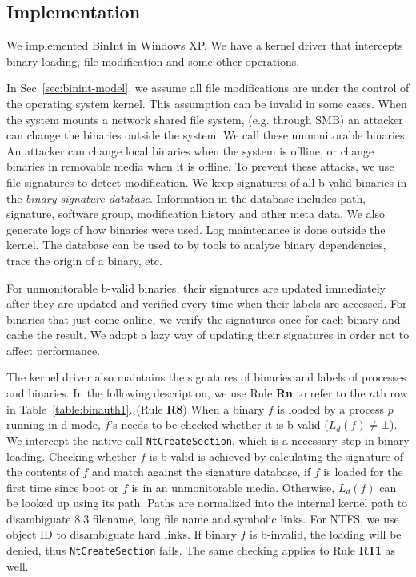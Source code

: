 \subsection{Implementation}
\label{sec:binint-imp}

We implemented BinInt in Windows XP.
We have a kernel driver that intercepts binary loading,
file modification and some other operations.

In Sec~\ref{sec:binint-model}, we assume all file modifications are under
the control of the operating system kernel.
This assumption can be invalid in some cases.
When the system mounts a network shared file system, (e.g. through SMB)
an attacker can change the binaries outside the system.
We call these unmonitorable binaries.
An attacker can change local binaries when the system is offline,
or change binaries in removable media when it is offline.
To prevent these attacks, we use file signatures to detect modification.
We keep signatures of all b-valid binaries in the
{\em binary signature database}.
Information in the database includes path, signature, software group,
modification history and other meta data.
We also generate logs of how binaries were used. Log maintenance is done
outside the kernel.
The database can be used to by tools to analyze binary dependencies,
trace the origin of a binary, etc.

For unmonitorable b-valid binaries, their signatures are updated
immediately after they are updated and verified every time when
their labels are accessed.
For binaries that just come online, we verify the signatures
once for each binary and cache the result.
We adopt a lazy way of updating their signatures in order
not to affect performance.

The kernel driver also maintains the signatures of binaries and
labels of processes and binaries.
In the following description, we use Rule {\bf Rn} to refer to the $n$th
row in Table~\ref{table:binauth1}.
(Rule {\bf R8})
When a binary $f$ is loaded by a process $p$ running in d-mode,
$f$'s needs to be checked whether it is b-valid ($L_d(f) \neq \bot$).
We intercept the native call {\tt NtCreateSection},
which is a necessary step in binary loading.
Checking whether $f$ is b-valid is achieved by calculating 
the signature of the contents
of $f$ and match against the signature database, if $f$ is loaded for the first
time since boot or $f$ is in an unmonitorable media.
Otherwise, $L_d(f)$ can be looked up using its path.
Paths are normalized into
the internal kernel path to disambiguate 8.3 filename, long file name
and symbolic links.
For NTFS, we use object ID to disambiguate hard links.
If binary $f$ is b-invalid,
the loading will be denied, thus {\tt NtCreateSection} fails.
The same checking applies to Rule {\bf R11} as well.

